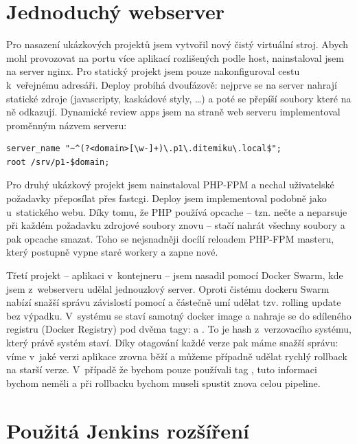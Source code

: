 \section{Jednoduchý webserver}
    Pro nasazení ukázkových projektů jsem vytvořil nový čistý virtuální stroj. Abych mohl provozovat na \HTTP portu více aplikací rozlišených podle host, nainstaloval jsem na server nginx. Pro statický projekt jsem pouze nakonfiguroval cestu k~veřejnému adresáři. Deploy probíhá dvoufázově: nejprve se na server nahrají statické zdroje (javascripty, kaskádové styly, \ldots) a poté se přepíší  soubory které na ně odkazují. Dynamické review apps jsem na straně web serveru implementoval proměnným názvem serveru:

    \begin{verbatim}
server_name "~^(?<domain>[\w-]+)\.p1\.ditemiku\.local$";
root /srv/p1-$domain;
    \end{verbatim}

    Pro druhý ukázkový projekt jsem nainstaloval PHP-FPM a nechal uživatelské požadavky přeposílat přes fastcgi. Deploy jsem implementoval podobně jako u~statického webu. Díky tomu, že PHP používá opcache -- tzn. nečte a neparsuje při každém požadavku zdrojové soubory znovu -- stačí nahrát všechny soubory a pak opcache smazat. Toho se nejsnadněji docílí reloadem PHP-FPM masteru, který postupně vypne staré workery a zapne nové.

    Třetí projekt -- aplikaci v~kontejneru -- jsem nasadil pomocí Docker Swarm, kde jsem z~webserveru udělal jednouzlový server. Oproti čistému dockeru Swarm nabízí snažší správu závislostí pomocí  a částečně umí udělat tzv. rolling update bez výpadku. V~\CI systému se staví samotný docker image a nahraje se do sdíleného registru (Docker Registry) pod dvěma tagy:  a . To je hash z~verzovacího systému, který právě \CI systém staví. Díky otagování každé verze pak máme snažší správu: víme v~jaké verzi aplikace zrovna běží a můžeme případně udělat rychlý rollback na starší verze. V~případě že bychom pouze používali tag , tuto informaci bychom neměli a při rollbacku bychom museli spustit znova celou \CI pipeline.

\newpage
\section{Použitá Jenkins rozšíření}
\label{ch:jenkins-plugins}

